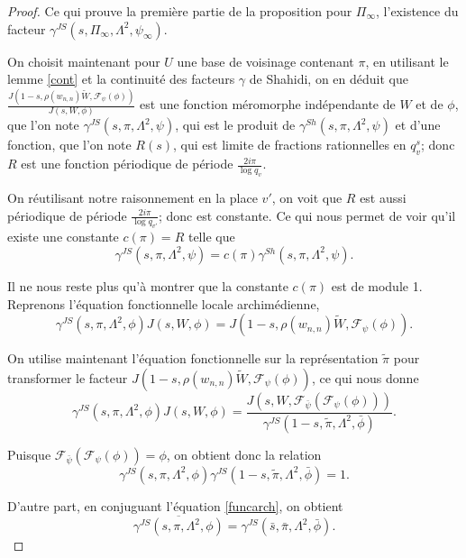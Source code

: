 \documentclass{amsart}
\begin{document}
\begin{proof}
 Ce qui prouve la première partie de la proposition pour $\Pi_\infty$, l'existence du facteur $\gamma^{JS}(s, \Pi_\infty, \Lambda^2, \psi_\infty)$.
 
 On choisit maintenant pour $U$ une base de voisinage contenant $\pi$, en utilisant le lemme \ref{cont} et la continuité des facteurs $\gamma$ de Shahidi, on en déduit que $\frac{J(1-s, \rho(w_{n,n})\tilde{W}, \mathcal{F}_\psi(\phi))}{J(s, W, \phi)}$
 est une fonction méromorphe indépendante de $W$ et de $\phi$, que l'on note $\gamma^{JS}(s, \pi, \Lambda^2, \psi)$, qui est le produit de $\gamma^{Sh}(s, \pi, \Lambda^2, \psi)$ et d'une fonction, que l'on note $R(s)$, qui est limite de fractions rationnelles en $q_v^s$; donc $R$ est une fonction périodique de période $\frac{2i\pi}{\log q_v}$.
 
  On réutilisant notre raisonnement en la place $v'$, on voit que $R$ est aussi périodique de période $\frac{2i\pi}{\log q_{v'}}$; donc est constante. Ce qui nous permet de voir qu'il existe une constante $c(\pi)=R$ telle que
 \begin{equation}
 \gamma^{JS}(s, \pi, \Lambda^2, \psi) = c(\pi)\gamma^{Sh}(s, \pi, \Lambda^2, \psi).
 \end{equation}
 
 Il ne nous reste plus qu'à montrer que la constante $c(\pi)$ est de module 1. Reprenons l'équation fonctionnelle locale archimédienne,
 \begin{equation}
 \label{funcarch}
 \gamma^{JS}(s, \pi, \Lambda^2, \phi) J(s, W, \phi) = J(1-s, \rho(w_{n,n})\tilde{W}, \mathcal{F}_\psi(\phi)).
 \end{equation}
 
 On utilise maintenant l'équation fonctionnelle sur la représentation $\tilde{\pi}$ pour transformer le facteur $J(1-s, \rho(w_{n,n})\tilde{W}, \mathcal{F}_\psi(\phi))$, ce qui nous donne
 \begin{equation}
 \gamma^{JS}(s, \pi, \Lambda^2, \phi) J(s, W, \phi) = \frac{J(s, W, \mathcal{F}_{\bar{\psi}}(\mathcal{F}_\psi(\phi)))}{\gamma^{JS}(1-s, \tilde{\pi}, \Lambda^2, \bar{\phi})}.
 \end{equation}
 
 Puisque $\mathcal{F}_{\bar{\psi}}(\mathcal{F}_\psi(\phi)) = \phi$, on obtient donc la relation 
 \begin{equation}
 \gamma^{JS}(s, \pi, \Lambda^2, \phi)\gamma^{JS}(1-s, \tilde{\pi}, \Lambda^2, \bar{\phi}) = 1.
 \end{equation}
 
 D'autre part, en conjuguant l'équation \ref{funcarch}, on obtient
 \begin{equation}
 \overline{\gamma^{JS}(s, \pi, \Lambda^2, \phi)} = \gamma^{JS}(\bar{s}, \bar{\pi}, \Lambda^2, \bar{\phi}).
 \end{equation}
 

\end{proof}
\end{document}
